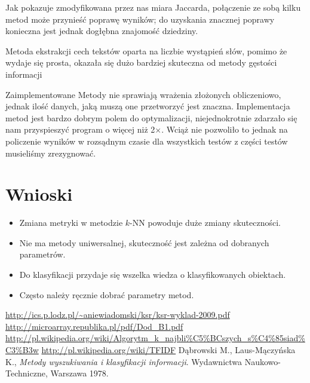 \documentclass{classrep}
\begin{document}
Jak pokazuje zmodyfikowana przez nas miara Jaccarda, połączenie ze sobą kilku metod może przynieść poprawę wyników; do uzyskania znacznej poprawy konieczna jest jednak dogłębna znajomość dziedziny.

Metoda ekstrakcji cech tekstów oparta na liczbie wystąpień słów, pomimo że wydaje się prosta, okazała się dużo bardziej skuteczna od metody gęstości informacji

Zaimplementowane Metody nie sprawiają wrażenia złożonych obliczeniowo, jednak ilość danych, jaką muszą one przetworzyć jest znaczna. Implementacja metod jest bardzo dobrym polem do optymalizacji, niejednokrotnie zdarzało się nam przyspieszyć program o więcej niż 2$\times$. Wciąż nie pozwoliło to jednak na policzenie wyników w rozsądnym czasie dla wszystkich testów \ppauza z części testów musieliśmy zrezygnować.

\section{Wnioski}
\begin{itemize}
 \item Zmiana metryki w metodzie $k$-NN powoduje duże zmiany skuteczności.
 \item Nie ma metody uniwersalnej, skuteczność jest zależna od dobranych parametrów.
 \item Do klasyfikacji przydaje się wszelka wiedza o klasyfikowanych obiektach.
 \item Często należy ręcznie dobrać parametry metod.
\end{itemize}

\begin{thebibliography}{0}
	 \url{http://ics.p.lodz.pl/~aniewiadomski/ksr/ksr-wyklad-2009.pdf}
	 \url{http://microarray.republika.pl/pdf/Dod\_B1.pdf}
	 \url{http://pl.wikipedia.org/wiki/Algorytm\_k\_najbli\%C5\%BCszych\_s\%C4\%85siad\%C3\%B3w}
	 \url{http://pl.wikipedia.org/wiki/TFIDF}
	 Dąbrowski M., Laus-Mączyńska K., \textit{Metody wyszukiwania i klasyfikacji informacji}. Wydawnictwa Naukowo-Techniczne, Warszawa 1978.
\end{thebibliography}
\end{document}
